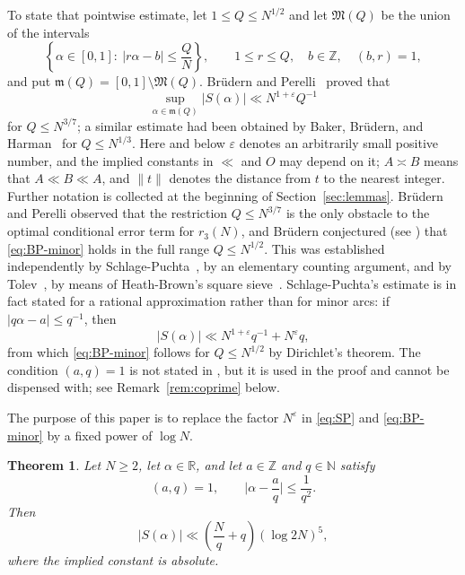 \documentclass[11pt]{amsart}
\numberwithin{equation}{section}
\numberwithin{figure}{section}
\newtheorem{theorem}{Theorem}[section]
\theoremstyle{definition}
\newcommand{\Z}{\mathbb{Z}}
\newcommand{\R}{\mathbb{R}}
\newcommand{\N}{\mathbb{N}}
\newcommand{\eps}{\varepsilon}
\newcommand{\Major}{\mathfrak{M}}
\newcommand{\Minor}{\mathfrak{m}}
\begin{document}
To state that pointwise estimate, let $1\le Q\le N^{1/2}$ and let
$\Major(Q)$ be the union of the intervals
\begin{equation}\label{eq:major-arcs}
  \left\{\alpha\in[0,1]:\ |r\alpha-b|\le\frac QN\right\},
  \qquad 1\le r\le Q,\quad b\in\Z,\quad (b,r)=1,
\end{equation}
and put $\Minor(Q)=[0,1]\setminus\Major(Q)$.  Br\"udern and
Perelli~\cite[Theorem~4]{BP} proved that
\begin{equation}\label{eq:BP-minor}
  \sup_{\alpha\in\Minor(Q)}|S(\alpha)|\ll N^{1+\eps}Q^{-1}
\end{equation}
for $Q\le N^{3/7}$; a similar estimate had been obtained by Baker,
Br\"udern, and Harman~\cite{BBH} for $Q\le N^{1/3}$.  Here and below
$\eps$ denotes an arbitrarily small positive number, and the implied
constants in $\ll$ and $O$ may depend on it; $A\asymp B$ means that
$A\ll B\ll A$, and $\|t\|$ denotes the distance from $t$ to the nearest
integer.  Further notation is collected at the beginning of
Section~\ref{sec:lemmas}.  Br\"udern and Perelli observed \cite[p.~610]{BP} that the
restriction $Q\le N^{3/7}$ is the only obstacle to the optimal conditional
error term for $r_3(N)$, and Br\"udern conjectured (see \cite{SP}) that
\eqref{eq:BP-minor} holds in the full range $Q\le N^{1/2}$.  This was
established independently by
Schlage-Puchta~\cite{SP}, by an elementary counting argument, and by
Tolev~\cite{Tolev}, by means of Heath-Brown's square sieve~\cite{HB}.
Schlage-Puchta's estimate is in fact stated for a rational approximation
rather than for minor arcs: if $|q\alpha-a|\le q^{-1}$, then
\begin{equation}\label{eq:SP}
  |S(\alpha)|\ll N^{1+\eps}q^{-1}+N^{\eps}q,
\end{equation}
from which \eqref{eq:BP-minor} follows for $Q\le N^{1/2}$ by Dirichlet's
theorem.  The condition $(a,q)=1$ is not stated in \cite{SP}, but it is used
in the proof and cannot be dispensed with; see Remark~\ref{rem:coprime} below.

The purpose of this paper is to replace the factor $N^{\eps}$ in
\eqref{eq:SP} and \eqref{eq:BP-minor} by a fixed power of $\log N$.

\begin{theorem}\label{thm:main}
Let $N\ge2$, let $\alpha\in\R$, and let $a\in\Z$ and $q\in\N$ satisfy
\begin{equation}\label{eq:main-hyp}
  (a,q)=1,\qquad \bigg|\alpha-\frac aq\bigg|\le\frac1{q^2}.
\end{equation}
Then
\begin{equation}\label{eq:main-bound}
  |S(\alpha)|\ll\left(\frac Nq+q\right)(\log 2N)^{5},
\end{equation}
where the implied constant is absolute.
\end{theorem}
\end{document}

